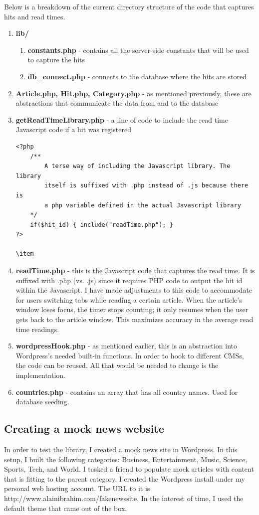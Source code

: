 \documentclass[12pt]{article}
\begin{document}
\newpage

\noindent Below is a breakdown of the current directory structure of the code that captures hits and read times.
\begin{enumerate}
\item \textbf{lib/}
\begin{enumerate}
\item \textbf{constants.php} - contains all the server-side constants that will be used to capture the hits
\item \textbf{db\_connect.php} - connects to the database where the hits are stored
\end{enumerate}
\item \textbf{Article.php, Hit.php, Category.php} - as mentioned previously, these are abstractions that communicate the data from and to the database
\item \textbf{getReadTimeLibrary.php} - a line of code to include the read time Javascript code if a hit was registered
\begin{lstlisting}[basicstyle=\scriptsize]
<?php 
	/**
		A terse way of including the Javascript library. The library 
		itself is suffixed with .php instead of .js because there is 
		a php variable defined in the actual Javascript library
	*/
	if($hit_id) { include("readTime.php"); } 
?>

\item
\end{lstlisting}
\item \textbf{readTime.php} - this is the Javascript code that captures the read time. It is suffixed with .php (vs. .js) since it requires PHP code to output the hit id within the Javascript. I have made adjustments to this code to accommodate for users switching tabs while reading a certain article. When the article's window loses focus, the timer stops counting; it only resumes when the user gets back to the article window. This maximizes accuracy in the average read time readings.
\item \textbf{wordpressHook.php} - as mentioned earlier, this is an abstraction into Wordpress's needed built-in functions. In order to hook to different CMSs, the code can be reused. All that would be needed to change is the implementation.
\item \textbf{countries.php} - contains an array that has all country names. Used for database seeding.
\end{enumerate}
\subsection{Creating a mock news website}
In order to test the library, I created a mock news site in Wordpress. In this setup, I built the following categories: Business, Entertainment, Music, Science, Sports, Tech, and World. I tasked a friend to populate mock articles with content that is fitting to the parent category. I created the Wordpress install under my personal web hosting account. The URL to it is http://www.alainibrahim.com/fakenewssite. In the interest of time, I used the default theme that came out of the box. \\
\end{document}
